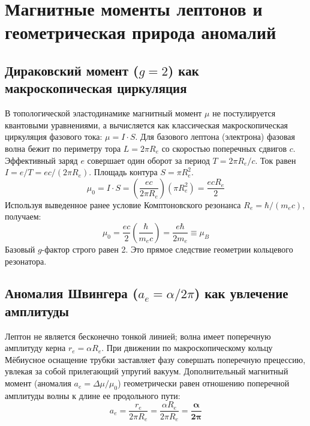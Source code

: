 \documentclass[12pt,a4paper]{article}
\begin{document}
	
	\setcounter{section}{4} %
	
	\section{Магнитные моменты лептонов и геометрическая природа аномалий}
	
	\subsection{Дираковский момент ($g=2$) как макроскопическая циркуляция}
	В топологической эластодинамике магнитный момент $\mu$ не постулируется квантовыми уравнениями, а вычисляется как классическая макроскопическая циркуляция фазового тока: $\mu = I \cdot S$.
	Для базового лептона (электрона) фазовая волна бежит по периметру тора $L = 2\pi R_e$ со скоростью поперечных сдвигов $c$. Эффективный заряд $e$ совершает один оборот за период $T = 2\pi R_e / c$.
	Ток равен $I = e/T = e c / (2\pi R_e)$. Площадь контура $S = \pi R_e^2$.
	\begin{equation}
		\mu_0 = I \cdot S = \left( \frac{e c}{2\pi R_e} \right) (\pi R_e^2) = \frac{e c R_e}{2}
	\end{equation}
	Используя выведенное ранее условие Комптоновского резонанса $R_e = \hbar / (m_e c)$, получаем:
	\begin{equation}
		\mu_0 = \frac{e c}{2} \left( \frac{\hbar}{m_e c} \right) = \frac{e \hbar}{2 m_e} \equiv \mu_B
	\end{equation}
	Базовый $g$-фактор строго равен 2. Это прямое следствие геометрии кольцевого резонатора.
	
	\subsection{Аномалия Швингера ($a_e = \alpha/2\pi$) как увлечение амплитуды}
	Лептон не является бесконечно тонкой линией; волна имеет поперечную амплитуду керна $r_e = \alpha R_e$. При движении по макроскопическому кольцу Мёбиусное оснащение трубки заставляет фазу совершать поперечную прецессию, увлекая за собой прилегающий упругий вакуум.
	Дополнительный магнитный момент (аномалия $a_e = \Delta \mu / \mu_0$) геометрически равен отношению поперечной амплитуды волны к длине ее продольного пути:
	\begin{equation}
		a_e = \frac{r_e}{2\pi R_e} = \frac{\alpha R_e}{2\pi R_e} = \mathbf{\frac{\alpha}{2\pi}}
	\end{equation}
	
\end{document}
